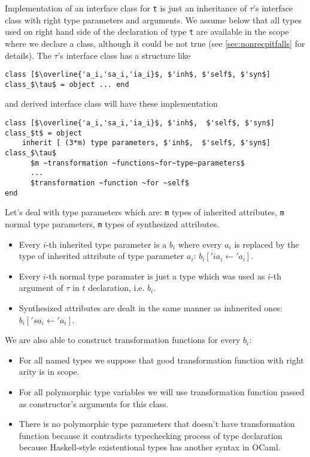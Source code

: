 \documentclass[acmsmall,review,anonymous]{acmart}\settopmatter{printfolios=true,printccs=false,printacmref=false}
\begin{document}
Implementation of an interface class for \lstinline{t} is just an inheritance of  $\tau$'s interface class with right type parameters and arguments. We assume below that all types used on right hand side of the declaration of type \lstinline{t} are available in the scope where we declare a class, although it could be not true (see \autoref{sec:nonrecpitfalls} for details). The $\tau$'s interface class has a structure like
\begin{lstlisting}
class [$\overline{'a_i,'sa_i,'ia_i}$, $'inh$, $'self$, $'syn$] class_$\tau$ = object ... end
\end{lstlisting}
and derived interface class will have these implementation
\begin{lstlisting}
class [$\overline{'a_i,'sa_i,'ia_i}$, $'inh$,  $'self$, $'syn$] class_$t$ = object
    inherit [ (3*m) type parameters, $'inh$,  $'self$, $'syn$] class_$\tau$ 
      $m ~transformation ~functions~for~type~parameters$
      ...
      $transformation ~function ~for ~self$
end
\end{lstlisting}
Let's deal with type parameters which are: 
\lstinline{m} types of inherited attributes, 
\lstinline{m} normal type parameters,
\lstinline{m} types of synthesized attributes. 
\begin{itemize}
 \item Every $i$-th inherited type parameter is a $b_i$ where every $a_i$ is replaced by the type of inherited attribute of type parameter $a_i$:  $b_i['ia_i \gets \!'a_i]$.
 \item Every $i$-th normal type paramater is just a type which was used as $i$-th argument of $\tau$ in $t$ declaration, i.e. $b_i$.
 \item Synthesized attributes are dealt in the same manner as inhnerited ones: $b_i['sa_i \gets \!'a_i]$.
\end{itemize}
We are also able to construct transformation functions for every $b_i$: 
\begin{itemize}
 \item For all named types we suppose that good transformation function with right arity is in scope.
 \item For all polymorphic type variables we will use transformation function passed as constructor's arguments for this class.
 \item There is no polymorphic type parameters that doesn't have transformation function because it contradicts typechecking process of type declaration because Haskell-style existentional types has another syntax in OCaml.
\end{itemize}
\end{document}
